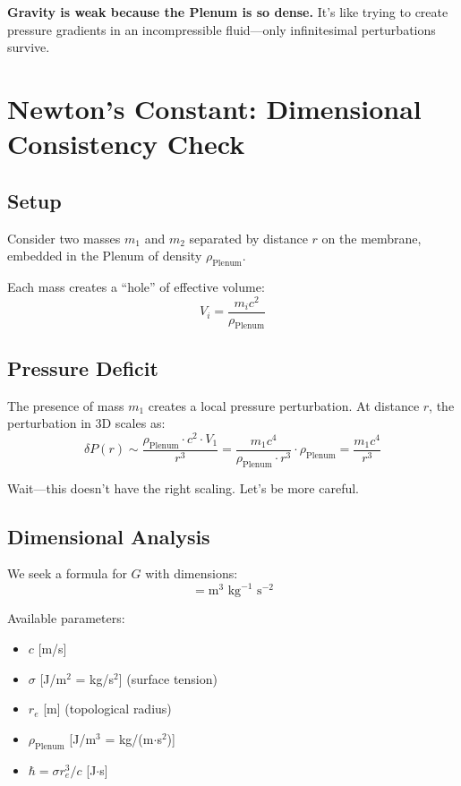 \textbf{Gravity is weak because the Plenum is so dense.} It's like trying to create pressure gradients in an incompressible fluid—only infinitesimal perturbations survive.

\newpage

\section{Newton's Constant: Dimensional Consistency Check}
\label{sec:g_derivation}

\subsection{Setup}

Consider two masses $m_1$ and $m_2$ separated by distance $r$ on the membrane, embedded in the Plenum of density $\rho_{\text{Plenum}}$.

Each mass creates a ``hole'' of effective volume:
\begin{equation}
V_i = \frac{m_i c^2}{\rho_{\text{Plenum}}}
\end{equation}

\subsection{Pressure Deficit}

The presence of mass $m_1$ creates a local pressure perturbation. At distance $r$, the perturbation in 3D scales as:
\begin{equation}
\delta P(r) \sim \frac{\rho_{\text{Plenum}} \cdot c^2 \cdot V_1}{r^3} = \frac{m_1 c^4}{\rho_{\text{Plenum}} \cdot r^3} \cdot \rho_{\text{Plenum}} = \frac{m_1 c^4}{r^3}
\end{equation}

Wait—this doesn't have the right scaling. Let's be more careful.

\subsection{Dimensional Analysis}

We seek a formula for $G$ with dimensions:
\begin{equation}
[G] = \text{m}^3 \text{ kg}^{-1} \text{ s}^{-2}
\end{equation}

Available parameters:
\begin{itemize}
    \item $c$ [m/s]
    \item $\sigma$ [J/m$^2$ = kg/s$^2$] (surface tension)
    \item $r_e$ [m] (topological radius)
    \item $\rho_{\text{Plenum}}$ [J/m$^3$ = kg/(m$\cdot$s$^2$)]
    \item $\hbar = \sigma r_e^3/c$ [J$\cdot$s]
\end{itemize}

